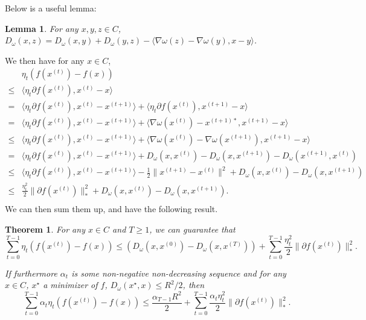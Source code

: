 \documentclass[openany]{book}
\newtheorem{lemma}{Lemma}[chapter]
\newtheorem{theorem}{Theorem}[chapter]
\theoremstyle{definition}
\theoremstyle{remark}
\begin{document}
Below is a useful lemma:
\begin{lemma}
    For any $x,y,z\in C$, $D_{\omega}(x,z)=D_{\omega}(x,y)+D_{\omega}(y,z)-\langle\nabla\omega(z)-\nabla\omega(y),x-y\rangle$.
\end{lemma}
We then have for any $x\in C$,
\begin{equation*}
    \begin{split}
         & \eta_t\left(f(x^{(t)})-f(x)\right) \\
        \le & \langle\eta_t\partial f(x^{(t)}),x^{(t)}-x\rangle \\
        = & \langle\eta_t\partial f(x^{(t)}),x^{(t)}-x^{(t+1)}\rangle+\langle\eta_t\partial f(x^{(t)}),x^{(t+1)}-x\rangle \\
        = & \langle\eta_t\partial f(x^{(t)}),x^{(t)}-x^{(t+1)}\rangle+\langle\nabla\omega(x^{(t)})-x^{(t+1)*},x^{(t+1)}-x\rangle \\
        \le & \langle\eta_t\partial f(x^{(t)}),x^{(t)}-x^{(t+1)}\rangle+\langle\nabla\omega(x^{(t)})-\nabla\omega(x^{(t+1)}),x^{(t+1)}-x\rangle \\
        = & \langle\eta_t\partial f(x^{(t)}),x^{(t)}-x^{(t+1)}\rangle+D_{\omega}(x,x^{(t)})-D_{\omega}(x,x^{(t+1)})-D_{\omega}(x^{(t+1)},x^{(t)}) \\
        \le & \langle\eta_t\partial f(x^{(t)}),x^{(t)}-x^{(t+1)}\rangle-\frac{1}{2}\|x^{(t+1)}-x^{(t)}\|^2+D_{\omega}(x,x^{(t)})-D_{\omega}(x,x^{(t+1)}) \\
        \le & \frac{\eta_t^2}{2}\|\partial f(x^{(t)})\|_*^2+D_{\omega}(x,x^{(t)})-D_{\omega}(x,x^{(t+1)}). \\
    \end{split}
\end{equation*}
We can then sum them up, and have the following result.
\begin{theorem}\label{thm:MDGuarantee}
    For any $x\in C$ and $T\ge1$, we can guarantee that
    \begin{equation*}
        \sum_{t=0}^{T-1}\eta_t\left(f(x^{(t)})-f(x)\right)\le\left(D_{\omega}(x,x^{(0)})-D_{\omega}(x,x^{(T)})\right)+\sum_{t=0}^{T-1}\frac{\eta_t^2}{2}\|\partial f(x^{(t)})\|_*^2.
    \end{equation*}

    If furthermore $\alpha_t$ is some non-negative non-decreasing sequence and for any $x\in C$, $x^{\star}$ a minimizer of $f$, $D_{\omega}(x^{\star},x)\le R^2/2$, then
    \begin{equation*}
        \sum_{t=0}^{T-1}\alpha_t\eta_t\left(f(x^{(t)})-f(x)\right)\le \frac{\alpha_{T-1}R^2}{2}+\sum_{t=0}^{T-1}\frac{\alpha_t\eta_t^2}{2}\|\partial f(x^{(t)})\|_*^2.
    \end{equation*}
\end{theorem}
\end{document}
